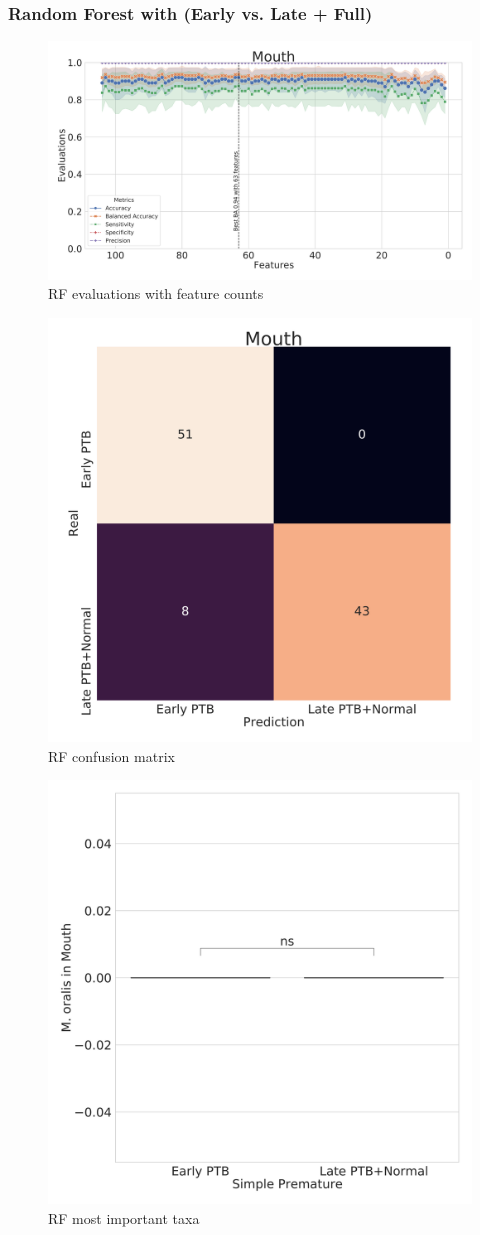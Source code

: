 \documentclass{beamer}
\begin{document}
    \begin{frame}[allowframebreaks]
        \frametitle{Random Forest with (Early vs. Late + Full)}

        \begin{figure}
            \includegraphics[width=0.8 \linewidth]{figures/RandomForest/RF-two.DADA2.homd.uncorrected/Mouth+metrics.pdf}
            \caption{RF evaluations with feature counts}
        \end{figure}

        \begin{figure}
            \includegraphics[width=0.5 \linewidth]{figures/RandomForest/RF-two.DADA2.homd.uncorrected/Mouth+heatmap.pdf}
            \caption{RF confusion matrix}
        \end{figure}

        \begin{figure}
            \includegraphics[width=0.5 \linewidth]{figures/RandomForest/RF-two.DADA2.homd.uncorrected/Mouth+Violin_0.pdf}
            \caption{RF most important taxa}
        \end{figure}
    \end{frame}
\end{document}
